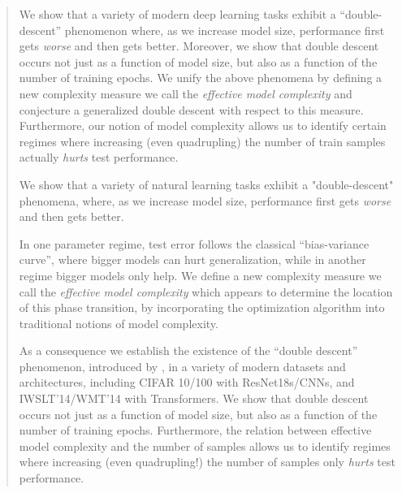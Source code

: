 \begin{abstract}

We show that a variety of modern deep learning tasks exhibit
a ``double-descent'' phenomenon where, as we increase model size, performance first gets \textit{worse} and then gets better.
Moreover, we show that double descent occurs not just as a function of model size, but also as a function of the number of training epochs.
We unify the above phenomena by defining
a new complexity measure we call the
\emph{effective model complexity}
and conjecture a generalized double descent with respect to this measure.
Furthermore,
our notion of model complexity
allows us to identify
certain regimes where increasing (even quadrupling) the number of
train samples actually \emph{hurts} test performance. 

\iffalse
We show that a variety of natural learning tasks exhibit a "double-descent" phenomena, where, as we increase model size, performance first gets \textit{worse} and then gets better.



In one parameter regime, test error follows the  classical ``bias-variance curve'', where bigger models can hurt generalization,
while in another regime bigger models only help.
We define a new complexity measure we call the \emph{effective model complexity} which appears to determine the location of this phase transition, 
by incorporating the optimization algorithm into traditional notions of model complexity.

As a consequence we establish the existence of the ``double descent'' phenomenon, introduced by \cite{belkin2018reconciling}, in a variety of modern datasets and architectures, 
including CIFAR 10/100 with ResNet18s/CNNs, and IWSLT'14/WMT'14 with Transformers.
We show that double descent occurs not just as a function of model size, but also as a function of the number of training epochs.
Furthermore, the relation between effective model complexity and  the number of samples allows us to identify regimes where increasing (even quadrupling!) the number of 
samples only \emph{hurts} test performance. 


\end{abstract}
